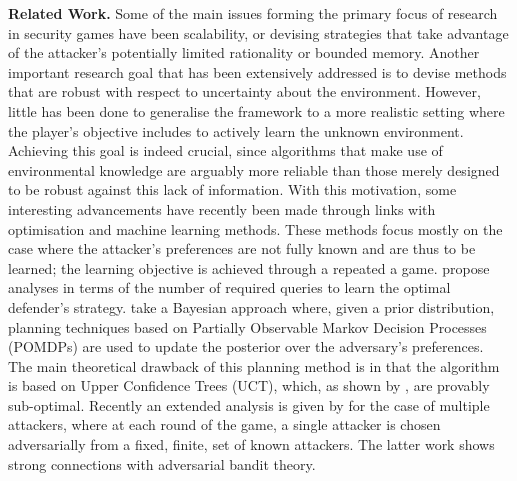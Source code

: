 \documentclass[a4paper,11pt]{article}
\renewcommand{\cite}{\autocite} %
\begin{document}
\textbf{Related Work.}
Some of the main issues forming the primary focus of research in security games have been scalability, or devising strategies that take advantage of the attacker's potentially limited rationality or bounded memory\cite{tambe2012game}. Another important research goal that has been extensively addressed is to devise methods that are robust with respect to uncertainty about the environment\cite{Nguyen14RO, aghassi2006robust}.
However, little has been done to generalise the framework to a more realistic setting where the player's objective includes to actively learn the unknown environment. Achieving this goal is indeed crucial, since algorithms that make use of environmental knowledge are arguably more reliable than those merely designed to be robust against this lack of information. With this motivation, some interesting advancements have recently been made through links with optimisation and machine learning methods. 
These methods focus mostly on the case where the attacker's preferences are not fully known and are thus to be learned; the learning objective is achieved through a repeated a game.  \cite{blum2014learning, letchford2009learning} propose analyses in terms of the number of required queries to learn the optimal defender's strategy. 
\cite{Marecki12PR, qian2014online} take a Bayesian approach where, given a prior distribution, planning techniques based on Partially Observable Markov Decision Processes (POMDPs) are used to update the posterior over the adversary's preferences.
The main theoretical drawback of this planning method is in that the algorithm is based on Upper Confidence Trees (UCT), which, as shown by  \cite{munos2014bandits}, are provably sub-optimal. 
Recently an extended analysis is given by \cite{Balcan15CR}  for the case of multiple attackers, where at each round of the game, a single attacker is chosen adversarially from a fixed, finite, set of known attackers. The latter work shows strong connections with adversarial bandit theory. 

\end{document}
